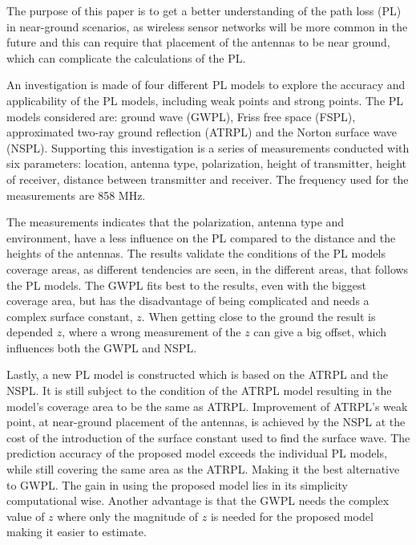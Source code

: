 \vspace{3em}
The purpose of this paper is to get a better understanding of the path loss (PL) in near-ground scenarios, as wireless sensor networks will be more common in the future and this can require that placement of the antennas to be near ground, which can complicate the calculations of the PL. 

An investigation is made of four different PL models to explore the accuracy and applicability of the PL models, including weak points and strong points. The PL models considered are: ground wave (GWPL), Friss free space (FSPL), approximated two-ray ground reflection (ATRPL) and the Norton surface wave (NSPL). Supporting this investigation is a series of measurements conducted with six parameters: location, antenna type, polarization, height of transmitter, height of receiver, distance between transmitter and receiver. The frequency used for the measurements are 858 MHz. 

The measurements indicates that the polarization, antenna type and environment, have a less influence on the PL compared to the distance and the heights of the antennas. The results validate the conditions of the PL models coverage areas, as different tendencies are seen, in the different areas, that follows the PL models. The GWPL fits best to the results, even with the biggest coverage area, but has the disadvantage of being complicated and needs a complex surface constant, $z$. When getting close to the ground the result is depended $z$, where a wrong measurement of the $z$ can give a big offset, which influences both the GWPL and NSPL. 
 
Lastly, a new PL model is constructed which is based on the ATRPL and the NSPL. It is still subject to the condition of the ATRPL model resulting in the model’s coverage area to be the same as ATRPL. Improvement of ATRPL’s weak point, at near-ground placement of the antennas, is achieved by the NSPL at the cost of the introduction of the surface constant used to find the surface wave. The prediction accuracy of the proposed model exceeds the individual PL models, while still covering the same area as the ATRPL. Making it the best alternative to GWPL. The gain in using the proposed model lies in its simplicity computational wise. Another advantage is that the GWPL needs the complex value of $z$ where only the magnitude of $z$ is needed for the proposed model making it easier to estimate.